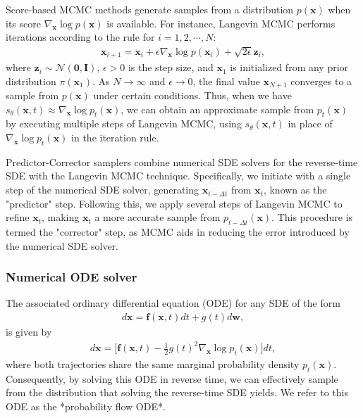 \documentclass{article}
\begin{document}
Score-based MCMC methods generate samples from a distribution $p(\mathbf{x})$ when its score $\nabla_\mathbf{x} \log p(\mathbf{x})$ is available. For instance, Langevin MCMC performs iterations according to the rule for $i=1,2,\cdots, N$:
\begin{align*}
\mathbf{x}_{i+1} = \mathbf{x}_{i} + \epsilon \nabla_\mathbf{x} \log p(\mathbf{x}_i) + \sqrt{2\epsilon} \mathbf{z}_i,
\end{align*}
where $\mathbf{z}_i \sim \mathcal{N}(\mathbf{0}, \mathbf{I})$, $\epsilon > 0$ is the step size, and $\mathbf{x}_1$ is initialized from any prior distribution $\pi(\mathbf{x}_1)$. As $N\to\infty$ and $\epsilon \to 0$, the final value $\mathbf{x}_{N+1}$ converges to a sample from $p(\mathbf{x})$ under certain conditions. Thus, when we have $s_\theta(\mathbf{x}, t) \approx \nabla_\mathbf{x} \log p_t(\mathbf{x})$, we can obtain an approximate sample from $p_t(\mathbf{x})$ by executing multiple steps of Langevin MCMC, using $s_\theta(\mathbf{x}, t)$ in place of $\nabla_\mathbf{x} \log p_t(\mathbf{x})$ in the iteration rule.

Predictor-Corrector samplers combine numerical SDE solvers for the reverse-time SDE with the Langevin MCMC technique. Specifically, we initiate with a single step of the numerical SDE solver, generating $\mathbf{x}_{t-\Delta t}$ from $\mathbf{x}_t$, known as the "predictor" step. Following this, we apply several steps of Langevin MCMC to refine $\mathbf{x}_t$, making $\mathbf{x}_t$ a more accurate sample from $p_{t-\Delta t}(\mathbf{x})$. This procedure is termed the "corrector" step, as MCMC aids in reducing the error introduced by the numerical SDE solver.
\subsubsection{Numerical ODE solver}
The associated ordinary differential equation (ODE) for any SDE of the form
\begin{align*}
d \mathbf{x} = \mathbf{f}(\mathbf{x}, t) d t + g(t) d \mathbf{w},
\end{align*}
is given by
\begin{align*}
d \mathbf{x} = \bigg[\mathbf{f}(\mathbf{x}, t) - \frac{1}{2}g(t)^2 \nabla_\mathbf{x} \log p_t(\mathbf{x})\bigg] dt,
\end{align*}
where both trajectories share the same marginal probability density $p_t(\mathbf{x})$. Consequently, by solving this ODE in reverse time, we can effectively sample from the distribution that solving the reverse-time SDE yields.
We refer to this ODE as the *probability flow ODE*.
\end{document}
